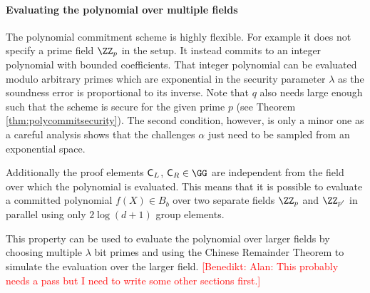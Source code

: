 \documentclass{article}
\theoremstyle{definition}
\newcommand{\benedikt}[1]{{\textcolor{red}{[Benedikt: #1]}}}
\newcommand{\benedikt}[1]{}
\begin{document}
\paragraph{Evaluating the polynomial over multiple fields}
The polynomial commitment scheme is highly flexible. For example it does not specify a prime field $\ZZ_p$ in the setup. It instead commits to an integer polynomial with bounded coefficients. That integer polynomial can be evaluated modulo arbitrary primes which are exponential in the security parameter $\lambda$ as the soundness error is proportional to its inverse.
Note that $q$ also needs large enough such that the scheme is secure for the given prime $p$ (see Theorem \ref{thm:polycommitsecurity}). The second condition, however, is only a minor one as a careful analysis shows that the challenges $\alpha$ just need to be sampled from an exponential space.

Additionally the proof elements $\mathsf{C}_L$, $\gr{C}_R \in \GG$ are independent from the field over which the polynomial is evaluated. This means that it is possible to evaluate a committed polynomial $f(X) \in B_b$ over two separate fields $\ZZ_{p}$ and $\ZZ_{p'}$ in parallel using only $2\log(d+1)$ group elements. 

This property can be used to evaluate the polynomial over larger fields by choosing multiple $\lambda$ bit primes and using the Chinese Remainder Theorem to simulate the evaluation over the larger field.
\benedikt{\@ Alan: This probably needs a pass but I need to write some other sections first.}
\end{document}
